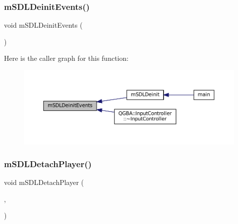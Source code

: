 \subsubsection{\texorpdfstring{m\+S\+D\+L\+Deinit\+Events()}{mSDLDeinitEvents()}}
{\footnotesize\ttfamily void m\+S\+D\+L\+Deinit\+Events (\begin{DoxyParamCaption}\item[{struct \mbox{\hyperlink{sdl-events_8h_structm_s_d_l_events}{m\+S\+D\+L\+Events}} $\ast$}]{ }\end{DoxyParamCaption})}

Here is the caller graph for this function\+:
\nopagebreak
\begin{figure}[H]
\begin{center}
\leavevmode
\includegraphics[width=350pt]{sdl-events_8h_af4ddb8c7e038688031b6635a928ae7fc_icgraph}
\end{center}
\end{figure}
\mbox{\label{sdl-events_8h_a14ff9c1218058211b6b5ddf4e8793dc3}} 
\subsubsection{\texorpdfstring{m\+S\+D\+L\+Detach\+Player()}{mSDLDetachPlayer()}}
{\footnotesize\ttfamily void m\+S\+D\+L\+Detach\+Player (\begin{DoxyParamCaption}\item[{struct \mbox{\hyperlink{sdl-events_8h_structm_s_d_l_events}{m\+S\+D\+L\+Events}} $\ast$}]{,  }\item[{struct \mbox{\hyperlink{sdl-events_8h_structm_s_d_l_player}{m\+S\+D\+L\+Player}} $\ast$}]{ }\end{DoxyParamCaption})}

